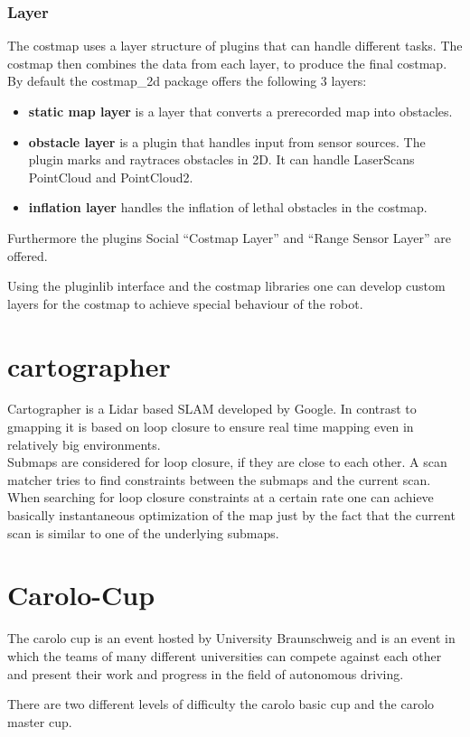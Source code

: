 \subsubsection{Layer}
The costmap uses a layer structure of plugins that can handle different tasks. The costmap then combines the data from each layer, to produce the final costmap.\\

By default the costmap\_2d package offers the following 3 layers:
\begin{itemize}
	\item \textbf{static map layer} is a layer that converts a prerecorded map into obstacles.
	\item  \textbf{obstacle layer} is a plugin that handles input from sensor sources. The plugin marks and raytraces obstacles in 2D. It can handle LaserScans PointCloud and PointCloud2.
	\item \textbf{inflation layer} handles the inflation of lethal obstacles in the costmap.
\end{itemize}

Furthermore the plugins Social ``Costmap Layer'' and ``Range Sensor Layer'' are offered.

Using the pluginlib interface and the costmap libraries one can develop custom layers for the costmap to achieve special behaviour of the robot.



\section{cartographer}
Cartographer is a Lidar based SLAM developed by Google. In contrast to gmapping it is based on loop closure to ensure real time mapping even in relatively big environments.\\
Submaps are considered for loop closure, if they are close to each other. A scan matcher tries to find constraints between the submaps and the current scan. When searching for loop closure constraints at a certain rate one can achieve basically instantaneous optimization of the map just by the fact that the current scan is similar to one of the underlying submaps\cite{cartographer}.\\

\section{Carolo-Cup}
The carolo cup is an event hosted by University Braunschweig and is an event in which the teams of many different universities can compete against each other and present their work and progress in the field of autonomous driving.

There are two different levels of difficulty the carolo basic cup and the carolo master cup.













